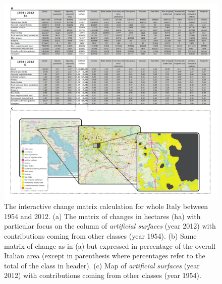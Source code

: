 \documentclass[APA,LATO1COL,doublespace]{WileyNJD-v2}
\begin{document}
\begin{figure}[t] %
    \centerline{\includegraphics[width=450pt]{04_caso_nazionale.pdf}}
    \caption{ The interactive change matrix calculation for whole Italy between 1954 and 2012.
    (a) The matrix of changes in hectares (ha) with particular focus on the column of \textit{artificial surfaces} (year 2012) with contributions coming from other classes (year 1954).
    (b) Same matrix of change as in (a) but expressed in percentage of the overall Italian area (except in parenthesis where percentages refer to the total of the class in header).
    (c) Map of \textit{artificial surfaces} (year 2012) with contributions coming from other classes (year 1954).
    } \label{fig:caseIT}
\end{figure}
\end{document}
